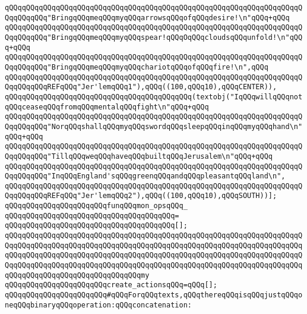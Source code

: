 \verb|qQQqqQQqqQQqqQQqqQQqqQQqqQQqqQQqqQQqqQQqqQQqqQQqqQQqqQQqqQQqqQQqqQQqqQQqqQQqqQQq"BringqQQqmeqQQqmyqQQqarrowsqQQqofqQQqdesire!\n"qQQq+qQQq|\newline
\verb|qQQqqQQqqQQqqQQqqQQqqQQqqQQqqQQqqQQqqQQqqQQqqQQqqQQqqQQqqQQqqQQqqQQqqQQqqQQqqQQq"BringqQQqmeqQQqmyqQQqspear!qQQqOqQQqcloudsqQQqunfold!\n"qQQq+qQQq|\newline
\verb|qQQqqQQqqQQqqQQqqQQqqQQqqQQqqQQqqQQqqQQqqQQqqQQqqQQqqQQqqQQqqQQqqQQqqQQqqQQqqQQq"BringqQQqmeqQQqmyqQQqchariotqQQqofqQQqfire!\n",qQQq|\newline
\verb|qQQqqQQqqQQqqQQqqQQqqQQqqQQqqQQqqQQqqQQqqQQqqQQqqQQqqQQqqQQqqQQqqQQqqQQqqQQqqQQqREFqQQq"Jer'lemqQQq1"),qQQq((100,qQQq10),qQQqCENTER)),|\newline
\verb|qQQqqQQqqQQqqQQqqQQqqQQqqQQqqQQqqQQqqQQqqQQq(textobj("IqQQqwillqQQqnotqQQqceaseqQQqfromqQQqmentalqQQqfight\n"qQQq+qQQq|\newline
\verb|qQQqqQQqqQQqqQQqqQQqqQQqqQQqqQQqqQQqqQQqqQQqqQQqqQQqqQQqqQQqqQQqqQQqqQQqqQQqqQQq"NorqQQqshallqQQqmyqQQqswordqQQqsleepqQQqinqQQqmyqQQqhand\n"qQQq+qQQq|\newline
\verb|qQQqqQQqqQQqqQQqqQQqqQQqqQQqqQQqqQQqqQQqqQQqqQQqqQQqqQQqqQQqqQQqqQQqqQQqqQQqqQQq"TillqQQqweqQQqhaveqQQqbuiltqQQqJerusalem\n"qQQq+qQQq|\newline
\verb|qQQqqQQqqQQqqQQqqQQqqQQqqQQqqQQqqQQqqQQqqQQqqQQqqQQqqQQqqQQqqQQqqQQqqQQqqQQqqQQq"InqQQqEngland'sqQQqgreenqQQqandqQQqpleasantqQQqland\n",|\newline
\verb|qQQqqQQqqQQqqQQqqQQqqQQqqQQqqQQqqQQqqQQqqQQqqQQqqQQqqQQqqQQqqQQqqQQqqQQqqQQqqQQqREFqQQq"Jer'lemqQQq2"),qQQq((100,qQQq10),qQQqSOUTH))];|\newline
\newline
\verb|qQQqqQQqqQQqqQQqqQQqqQQqfunqQQqmon_opsqQQq_|\newline
\verb|qQQqqQQqqQQqqQQqqQQqqQQqqQQqqQQqqQQqqQQq=|\newline
\verb|qQQqqQQqqQQqqQQqqQQqqQQqqQQqqQQqqQQqqQQq[];|\newline
\verb|qQQqqQQqqQQqqQQqqQQqqQQqqQQqqQQqqQQqqQQqqQQqqQQqqQQqqQQqqQQqqQQqqQQqqQQqqQQqqQQqqQQqqQQqqQQqqQQqqQQqqQQqqQQqqQQqqQQqqQQqqQQqqQQqqQQqqQQqqQQqqQQqqQQqqQQqqQQqqQQqqQQqqQQqqQQqqQQqqQQqqQQqqQQqqQQqqQQqqQQqqQQqqQQqqQQqqQQqqQQqqQQqqQQqqQQqqQQqqQQqqQQqqQQqqQQqqQQqqQQqqQQqqQQqqQQqqQQqqQQqqQQqqQQqqQQqqQQqqQQqqQQqqQQqqQQqmy|\newline
\verb|qQQqqQQqqQQqqQQqqQQqqQQqcreate_actionsqQQq=qQQq[];|\newline
\newline
\verb|qQQqqQQqqQQqqQQqqQQqqQQq#qQQqForqQQqtexts,qQQqthereqQQqisqQQqjustqQQqoneqQQqbinaryqQQqoperation:qQQqconcatenation:|\newline
